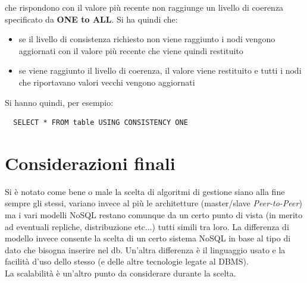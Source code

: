 \documentclass[a4paper,12pt, oneside]{book}
\begin{document}
che rispondono con il valore più recente non raggiunge un livello di coerenza
specificato da \textbf{ONE to ALL}. Si ha quindi che:
\begin{itemize}
  \item se il livello di consistenza richiesto non
  viene raggiunto i nodi vengono aggiornati con il valore più recente che viene
  quindi restituito
  \item se viene raggiunto il livello di coerenza, il valore viene restituito e
  tutti i nodi che riportavano valori vecchi vengono aggiornati
\end{itemize}
Si hanno quindi, per esempio:
\begin{verbatim}
  SELECT * FROM table USING CONSISTENCY ONE  
\end{verbatim}
\section{Considerazioni finali}
Si è notato come bene o male la scelta di algoritmi di gestione siano alla fine
sempre gli stessi, variano invece al più le architetture (master/slave
\textit{Peer-to-Peer}) ma i vari modelli NoSQL restano comunque da un certo
punto di vista (in merito ad eventuali repliche, distribuzione etc$\ldots$)
tutti simili tra loro. La differenza di modello invece consente la scelta di un
certo sistema NoSQL in base al tipo di dato che bisogna inserire nel
db. Un'altra differenza è il linguaggio usato e la facilità d'uso dello
stesso (e delle altre tecnologie legate al DBMS).\\
La scalabilità è un'altro punto da considerare durante la scelta.
\end{document}
